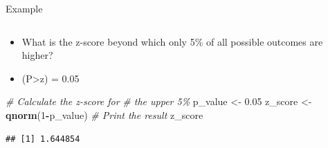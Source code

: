 \documentclass[
  ignorenonframetext,
]{beamer}
\newenvironment{Shaded}{\begin{snugshade}}{\end{snugshade}}
\newcommand{\CommentTok}[1]{\textcolor[rgb]{0.56,0.35,0.01}{\textit{#1}}}
\newcommand{\DecValTok}[1]{\textcolor[rgb]{0.00,0.00,0.81}{#1}}
\newcommand{\FloatTok}[1]{\textcolor[rgb]{0.00,0.00,0.81}{#1}}
\newcommand{\FunctionTok}[1]{\textcolor[rgb]{0.13,0.29,0.53}{\textbf{#1}}}
\newcommand{\NormalTok}[1]{#1}
\newcommand{\OtherTok}[1]{\textcolor[rgb]{0.56,0.35,0.01}{#1}}
\newcommand{\SpecialCharTok}[1]{\textcolor[rgb]{0.81,0.36,0.00}{\textbf{#1}}}
\providecommand{\tightlist}{%
  \setlength{\itemsep}{0pt}\setlength{\parskip}{0pt}}
\begin{document}
\begin{frame}[fragile]{Example}
\label{example-4}
\begin{columns}[T]
\begin{column}{0.5\textwidth}
\vspace{1cm}

\begin{itemize}
\tightlist
\item
  What is the z-score beyond which only 5\% of all possible outcomes are
  higher?
\end{itemize}

\begin{itemize}
\tightlist
\item
  (P\textgreater z) = 0.05
\end{itemize}

\begin{Shaded}
\begin{Highlighting}[]
\CommentTok{\# Calculate the z{-}score for }
\CommentTok{\# the upper 5\% }
\NormalTok{p\_value }\OtherTok{\textless{}{-}} \FloatTok{0.05}
\NormalTok{z\_score }\OtherTok{\textless{}{-}} \FunctionTok{qnorm}\NormalTok{(}\DecValTok{1}\SpecialCharTok{{-}}\NormalTok{p\_value)}
\CommentTok{\# Print the result}
\NormalTok{z\_score}
\end{Highlighting}
\end{Shaded}

\begin{verbatim}
## [1] 1.644854
\end{verbatim}
\end{column}

\begin{column}{0.5\textwidth}
\vspace{1cm}


\end{column}
\end{columns}
\end{frame}
\end{document}

